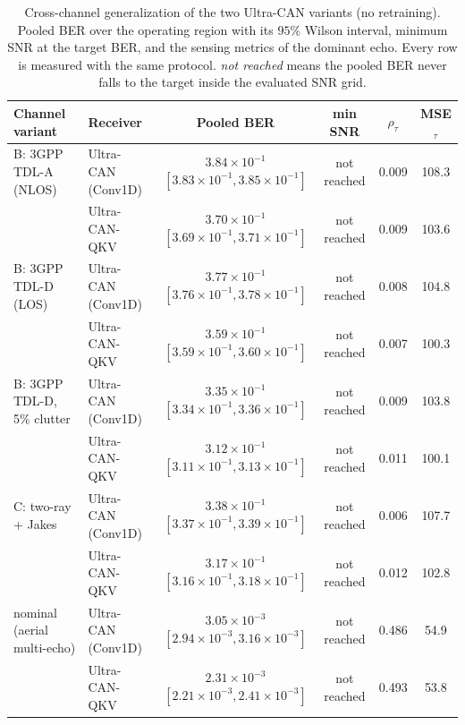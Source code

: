 \begin{table}[t]
\centering
\caption{Cross-channel generalization of the two Ultra-CAN variants (no retraining). Pooled BER over the operating region with its $95\%$ Wilson interval, minimum SNR at the target BER, and the sensing metrics of the dominant echo. Every row is measured with the same protocol. \emph{not reached} means the pooled BER never falls to the target inside the evaluated SNR grid.}
\label{tab:generalization}
\begin{tabular}{llcccc}
\toprule
Channel variant & Receiver & Pooled BER & min SNR & $\rho_\tau$ & MSE$_\tau$ \\
\midrule
B: 3GPP TDL-A (NLOS) & Ultra-CAN (Conv1D) & $3.84\times 10^{-1}$ $[3.83\times 10^{-1}, 3.85\times 10^{-1}]$ & not reached & 0.009 & 108.3 \\
 & Ultra-CAN-QKV & $3.70\times 10^{-1}$ $[3.69\times 10^{-1}, 3.71\times 10^{-1}]$ & not reached & 0.009 & 103.6 \\
\midrule
B: 3GPP TDL-D (LOS) & Ultra-CAN (Conv1D) & $3.77\times 10^{-1}$ $[3.76\times 10^{-1}, 3.78\times 10^{-1}]$ & not reached & 0.008 & 104.8 \\
 & Ultra-CAN-QKV & $3.59\times 10^{-1}$ $[3.59\times 10^{-1}, 3.60\times 10^{-1}]$ & not reached & 0.007 & 100.3 \\
\midrule
B: 3GPP TDL-D, 5\% clutter & Ultra-CAN (Conv1D) & $3.35\times 10^{-1}$ $[3.34\times 10^{-1}, 3.36\times 10^{-1}]$ & not reached & 0.009 & 103.8 \\
 & Ultra-CAN-QKV & $3.12\times 10^{-1}$ $[3.11\times 10^{-1}, 3.13\times 10^{-1}]$ & not reached & 0.011 & 100.1 \\
\midrule
C: two-ray + Jakes & Ultra-CAN (Conv1D) & $3.38\times 10^{-1}$ $[3.37\times 10^{-1}, 3.39\times 10^{-1}]$ & not reached & 0.006 & 107.7 \\
 & Ultra-CAN-QKV & $3.17\times 10^{-1}$ $[3.16\times 10^{-1}, 3.18\times 10^{-1}]$ & not reached & 0.012 & 102.8 \\
\midrule
nominal (aerial multi-echo) & Ultra-CAN (Conv1D) & $3.05\times 10^{-3}$ $[2.94\times 10^{-3}, 3.16\times 10^{-3}]$ & not reached & 0.486 & 54.9 \\
 & Ultra-CAN-QKV & $2.31\times 10^{-3}$ $[2.21\times 10^{-3}, 2.41\times 10^{-3}]$ & not reached & 0.493 & 53.8 \\
\bottomrule
\end{tabular}
\end{table}
